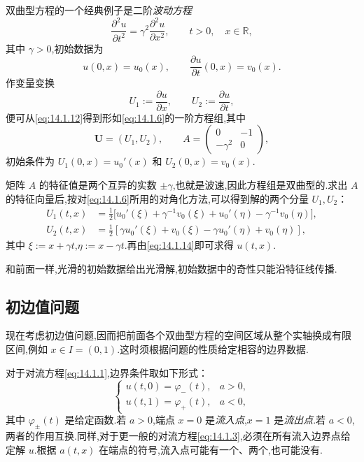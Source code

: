\begin{example}[波动方程]\label{ex:14.1.wave}
双曲型方程的一个经典例子是二阶\emph{波动方程}
\begin{equation}\label{eq:14.1.12}
  \frac{\partial^2u}{\partial t^2}=\gamma^2\frac{\partial^2u}{\partial x^2},
  \qquad t>0,\quad x\in\mathbb R,
\end{equation}
其中 \(\gamma>0\),初始数据为
\begin{equation}\label{eq:14.1.13}
  u(0,x)=u_0(x),\qquad \frac{\partial u}{\partial t}(0,x)=v_0(x).
\end{equation}
作变量变换
\begin{equation}\label{eq:14.1.14}
  U_1:=\frac{\partial u}{\partial x},\qquad U_2:=\frac{\partial u}{\partial t},
\end{equation}
便可从\eqref{eq:14.1.12}得到形如\eqref{eq:14.1.6}的一阶方程组,其中
\begin{equation}\label{eq:14.1.15}
  \boldsymbol{U}=(U_1,U_2),\qquad
  A=\begin{pmatrix}0&-1\\-\gamma^2&0\end{pmatrix},
\end{equation}
初始条件为 \(U_1(0,x)=u_0'(x)\) 和 \(U_2(0,x)=v_0(x)\).

矩阵 \(A\) 的特征值是两个互异的实数 \(\pm\gamma\),也就是波速,因此方程组是双曲型的.求出 \(A\) 的特征向量后,按对\eqref{eq:14.1.6}所用的对角化方法,可以得到解的两个分量 \(U_1,U_2\)：
\[
  \begin{aligned}
    U_1(t,x)&=\tfrac12\bigl[u_0'(\xi)+\gamma^{-1}v_0(\xi)
                 +u_0'(\eta)-\gamma^{-1}v_0(\eta)\bigr],\\
    U_2(t,x)&=\tfrac12[\gamma u_0'(\xi)+v_0(\xi)-\gamma u_0'(\eta)+v_0(\eta)],
  \end{aligned}
\]
其中 \(\xi:=x+\gamma t\),\(\eta:=x-\gamma t\).再由\eqref{eq:14.1.14}即可求得 \(u(t,x)\).

和前面一样,光滑的初始数据给出光滑解,初始数据中的奇性只能沿特征线传播.
\end{example}

\subsection{初边值问题}\label{sec:14.1.3}

现在考虑初边值问题,因而把前面各个双曲型方程的空间区域从整个实轴换成有限区间,例如 \(x\in I=(0,1)\).这时须根据问题的性质给定相容的边界数据.

对于对流方程\eqref{eq:14.1.1},边界条件取如下形式：
\begin{equation}\label{eq:14.1.16}
  \begin{cases}
    u(t,0)=\varphi_-(t), & a>0,\\
    u(t,1)=\varphi_+(t), & a<0,
  \end{cases}
\end{equation}
其中 \(\varphi_\pm(t)\) 是给定函数.若 \(a>0\),端点 \(x=0\) 是\emph{流入点},\(x=1\) 是\emph{流出点}.若 \(a<0\),两者的作用互换.同样,对于更一般的对流方程\eqref{eq:14.1.3},必须在所有流入边界点给定解 \(u\).根据 \(a(t,x)\) 在端点的符号,流入点可能有一个、两个,也可能没有.

